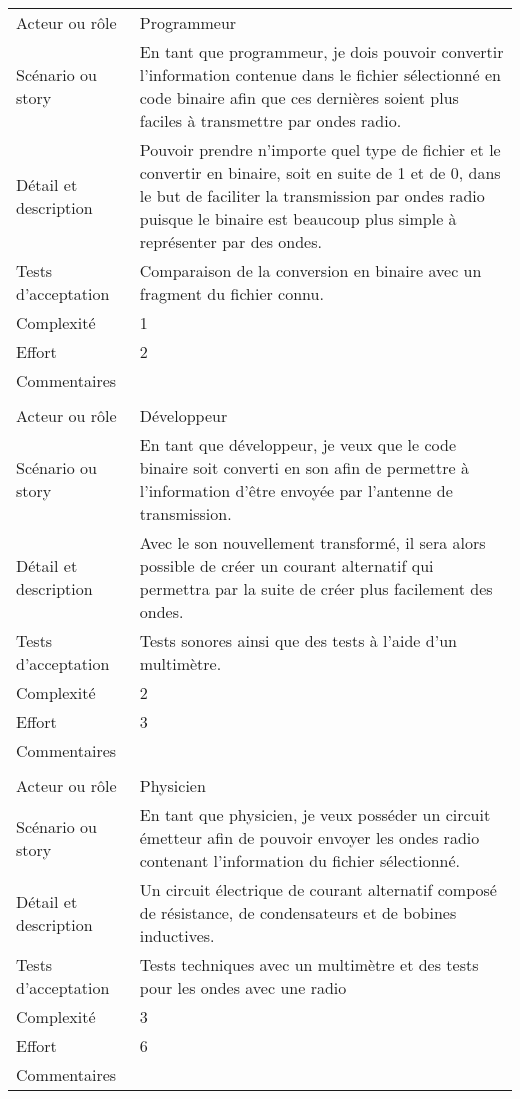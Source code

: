 \begin{longtable}{|l|p{}|}
\hline
    \rowcolor{Gray}
    \multicolumn{2}{|l|}{3} \\
\hline
    Acteur ou rôle & Programmeur\\
\hline
    Scénario ou story &  En tant que programmeur,
          je dois pouvoir convertir l'information contenue 
          dans le fichier sélectionné en code binaire afin que ces 
          dernières soient plus faciles à transmettre par ondes radio. \\
\hline
    Détail et description & Pouvoir prendre n'importe quel type de fichier et le convertir en binaire, soit en suite de 1 et de 0, dans le but de faciliter la transmission par ondes radio puisque le binaire est beaucoup plus simple à représenter par des ondes.
        \\
\hline
    Tests d'acceptation & Comparaison de la conversion en binaire avec un fragment du fichier connu. \\

\hline
    Complexité & 1 \\
\hline
    Effort & 2 \\
\hline
    Commentaires &  \\

\hline
    \rowcolor{Gray}
    \multicolumn{2}{|l|}{4} \\
\hline
    Acteur ou rôle & Développeur \\
\hline
    Scénario ou story & En tant que développeur,
          je veux que le code binaire soit converti en son afin de permettre à l'information d'être envoyée par l'antenne de transmission. \\
\hline
    Détail et description & Avec le son nouvellement transformé, il sera alors possible de créer un courant alternatif qui permettra par la suite de créer plus facilement des ondes. \\
\hline
    Tests d'acceptation & Tests sonores ainsi que des tests à l'aide d'un multimètre. \\
\hline
    Complexité & 2 \\
\hline
    Effort & 3 \\
\hline
    Commentaires &  \\

\hline
    \rowcolor{Gray}
    \multicolumn{2}{|l|}{5} \\
\hline
    Acteur ou rôle & Physicien \\
\hline
    Scénario ou story &  En tant que physicien,
          je veux posséder un circuit émetteur afin de pouvoir envoyer les ondes radio contenant l'information du fichier sélectionné.\\
\hline
    Détail et description & Un circuit électrique de courant alternatif composé de résistance, de condensateurs et de bobines inductives. \\
\hline
    Tests d'acceptation & Tests techniques avec un multimètre et des tests pour les ondes avec une radio \\
\hline
    Complexité & 3 \\
\hline
    Effort & 6 \\
\hline
    Commentaires &  \\


\end{longtable}
